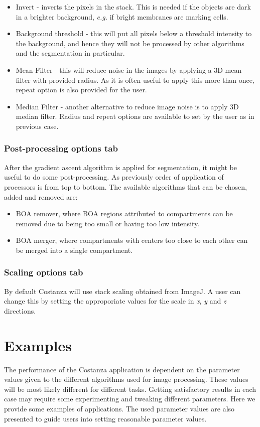 \documentclass[a4paper,12pt]{article}
\begin{document}
\begin{itemize}
%
\item Invert - inverts the pixels in the stack. This is needed if the objects
	are dark in a brighter background, \textit{e.g.} if bright membranes are marking
	cells.
%
\item Background threshold - this will put all pixels below a threshold
	intensity to the background, and hence they will not be processed by other algorithms and 
	the segmentation in particular.
%
\item Mean Filter - this will reduce noise in the images by applying a 3D mean
	filter with provided radius. As it is often useful to apply this more than
	once, repeat option is also provided for the user.
%
\item Median Filter - another alternative to reduce image noise is to apply 3D median filter.
	Radius and repeat options are available to set by the user as in previous case.
%
\end{itemize}

\subsubsection{Post-processing options tab}
After the gradient ascent algorithm is applied for segmentation, it might be
useful to do some post-processing. As previously order of application of processors is from top to bottom. The available algorithms that can be chosen, added and removed are:

\begin{itemize} 
%
\item BOA remover, where BOA regions attributed to compartments can be removed due to being too small
	or having too low intensity.
%
\item BOA merger, where compartments with centers too close to each other can be
	merged into a single compartment.
%
\end{itemize}

\subsubsection{Scaling options tab}
By default Costanza will use stack scaling obtained from ImageJ. A user can
change this by setting the approporiate values for the scale in \textit{x},
\textit{y} and \textit{z} directions.

\section{Examples}
The performance of the Costanza application is dependent on the parameter
values given to the different algorithms used for image processing. These
values will be most likely different for different tasks. Getting satisfactory
results in each case may require some experimenting and tweaking different
parameters. Here we provide some examples of applications. The used parameter
values are also presented to guide users into setting reasonable parameter
values.
\end{document}
